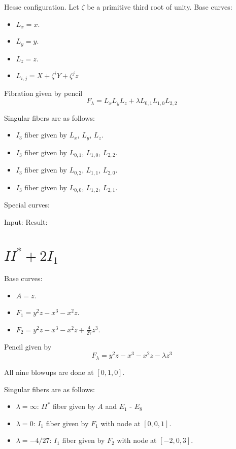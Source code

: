 \documentclass{article}
\begin{document}
Hesse configuration. Let $\zeta$ be a primitive third root of unity. Base curves:
\begin{itemize}
  \item $L_x = x$.
  \item $L_y = y$.
  \item $L_z = z$.
  \item $L_{i,j} = X + \zeta^i Y + \zeta^j z$
\end{itemize}
Fibration given by pencil
\[F_\lambda = L_x L_y L_z + \lambda L_{0,1} L_{1,0} L_{2,2}\]

Singular fibers are as follows:
\begin{itemize}
  \item $I_3$ fiber given by $L_x$, $L_y$, $L_z$.
  \item $I_3$ fiber given by $L_{0,1}$, $L_{1,0}$, $L_{2,2}$.
  \item $I_3$ fiber given by $L_{0,2}$, $L_{1,1}$, $L_{2,0}$.
  \item $I_3$ fiber given by $L_{0,0}$, $L_{1,2}$, $L_{2,1}$.
\end{itemize}
Special curves:

Input:
%
Result:
%

\section{$II^* + 2I_1$}

Base curves:
\begin{itemize}
  \item $A = z$.
  \item $F_1 = y^2z - x^3 - x^2z$.
  \item $F_2 = y^2z - x^3 - x^2z +\frac{4}{27}z^3$.
\end{itemize}
Pencil given by
\[F_\lambda = y^2z - x^3 - x^2z - \lambda z^3\]

All nine blowups are done at $[0,1,0]$.

Singular fibers are as follows:
\begin{itemize}
  \item $\lambda = \infty$: $II^*$ fiber given by $A$ and $E_1$ - $E_8$
  \item $\lambda = 0$: $I_1$ fiber given by $F_1$ with node at $[0,0,1]$.
  \item $\lambda = -4/27$: $I_1$ fiber given by $F_2$ with node at $[-2,0,3]$.
\end{itemize}
\end{document}
